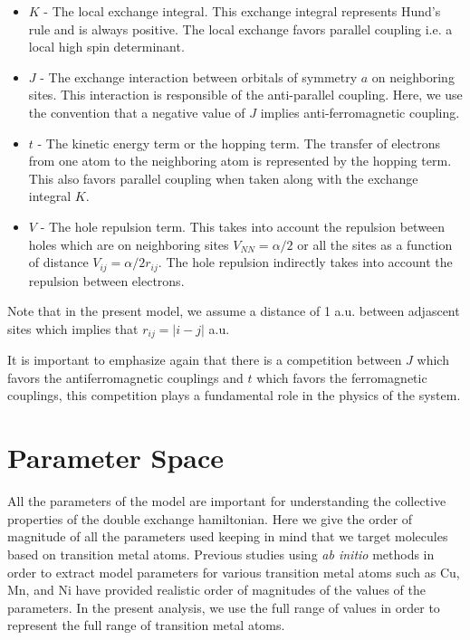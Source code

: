 \documentclass[12pt,twoside]{report}
\begin{document}
	\begin{itemize}
		
		\item $K$ - The local exchange integral. This exchange integral
		  represents Hund's rule and is always positive. The local exchange
		  favors parallel coupling i.e. a local high spin determinant.
		
		\item $J$ - The exchange interaction between orbitals of
		  symmetry $a$ on neighboring sites. This interaction is responsible of
		  the anti-parallel coupling. Here, we use the convention that a negative
		  value of $J$ implies anti-ferromagnetic coupling.
		
		\item $t$ - The kinetic energy term or the hopping term. The transfer of
		  electrons from one atom to the neighboring atom is represented by the
		  hopping term. This also favors parallel coupling when taken along with
		  the exchange integral $K$.
		
		\item $V$ - The hole repulsion term. This takes into account the
		  repulsion between holes which are on neighboring sites $V_{NN}=\alpha
		  \slash 2$ or all the sites as a function of distance $V_{ij}=\alpha
		  \slash 2r_{ij}$. The hole repulsion indirectly takes into account the
		  repulsion between electrons.\cite{calzado_proposal_2001}
		
	\end{itemize}

	Note that in the present model, we assume a distance of 1 a.u. between adjascent
	sites which implies that $r_{ij} = |i-j|$ a.u.
	
	It is important to emphasize again that there is a competition between $J$
	which favors the antiferromagnetic couplings and $t$ which favors the
	ferromagnetic couplings, this competition plays a fundamental role in the
	physics of the system.
	
	\section{Parameter Space}
	
	All the parameters of the model are important for understanding the
	collective properties of the double exchange hamiltonian. Here we give the
	order of magnitude of all the parameters used keeping in mind that we target
	molecules based on transition metal atoms.  Previous studies using
	\textit{ab initio} methods in order to extract model parameters for various
	transition metal atoms such as Cu, Mn, and Ni have provided realistic order
	of magnitudes of the values of the parameters.  In the present analysis, we
	use the full range of values in order to represent the full range of
	transition metal atoms.
	
\end{document}
